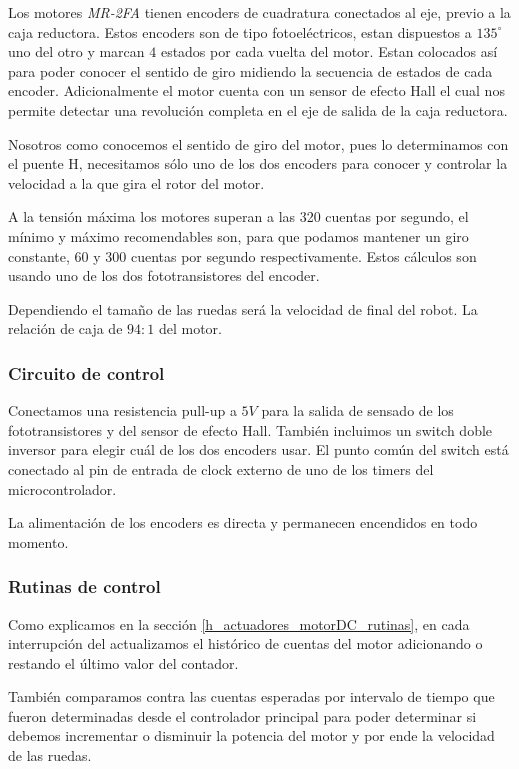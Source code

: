 Los motores \emph{MR-2FA} tienen encoders de cuadratura conectados al eje, previo a la caja reductora.
Estos encoders son de tipo fotoel\'ectricos, estan dispuestos a $135^{\circ}$ uno del otro y marcan $4$ estados por
cada vuelta del motor.
Estan colocados as\'i para poder conocer el sentido de giro midiendo la secuencia de estados de cada encoder.
Adicionalmente el motor cuenta con un sensor de efecto Hall el cual nos permite detectar una revoluci\'on completa
en el eje de salida de la caja reductora.

Nosotros como conocemos el sentido de giro del motor, pues lo determinamos con el puente H, necesitamos s\'olo
uno de los dos encoders para conocer y controlar la velocidad a la que gira el rotor del motor.

A la tensi\'on m\'axima los motores superan a las 320 cuentas por segundo, el m\'inimo y m\'aximo recomendables
son, para que podamos mantener un giro constante, $60$ y $300$ cuentas por segundo respectivamente.
Estos c\'alculos son usando uno de los dos fototransistores del encoder.

Dependiendo el tama\~no de las ruedas ser\'a la velocidad de final del robot.
La relaci\'on de caja de $94:1$ del motor.

\subsubsection{Circuito de control}
\label{h_sensado_encoder_circuito}

Conectamos una resistencia pull-up a $5V$ para la salida de sensado de los fototransistores y del
sensor de efecto Hall.
Tambi\'en incluimos un switch doble inversor para elegir cu\'al de los dos encoders usar.
El punto com\'un del switch est\'a conectado al pin de entrada de clock externo de uno de los timers del
microcontrolador.

La alimentaci\'on de los encoders es directa y permanecen encendidos en todo momento.

\subsubsection{Rutinas de control}
\label{h_sensado_encoder_rutinas}

Como explicamos en la secci\'on \ref{h_actuadores_motorDC_rutinas}, en cada interrupci\'on del actualizamos
el hist\'orico de cuentas del motor adicionando o restando el \'ultimo valor del contador.

Tambi\'en comparamos contra las cuentas esperadas por intervalo de tiempo que fueron determinadas desde el controlador
principal para poder determinar si debemos incrementar o disminuir la potencia del motor y por ende la velocidad de las ruedas.

